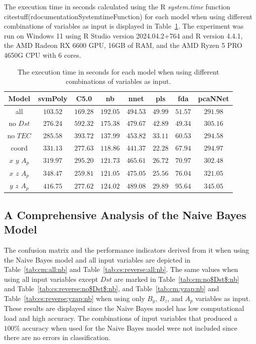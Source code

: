 \documentclass[preprint,12pt]{elsarticle}
\begin{document}
The execution time in seconds calculated using the R \textit{system.time} function citestuff(rdocumentationSystemtimeFunction) for each model when using different combinations of variables as input is displayed in Table~\ref{tab:time:total}. The experiment was run on Windows 11 using R Studio version 2024.04.2+764 and R version 4.4.1, the AMD Radeon RX 6600 GPU, 16GB of RAM, and the AMD Ryzen 5 PRO 4650G CPU with 6 cores.

\begin{table}[!ht]
	\centering
	\begin{tabular}{|c|c|c|c|c|c|c|c|}
		\hline
		Model & svmPoly & C5.0 & nb & nnet & pls & fda & pcaNNet \\ \hline
		all & $103.52$ & $169.28$ & $192.05$ & $494.53$ & $49.99$ & $51.57$ & $291.98$ \\ \hline
		no $Dst$ & $276.24$ & $592.32$ & $175.38$ & $479.67$ & $42.89$ & $49.34$ & $305.16$ \\ \hline
		no $TEC$ & $285.58$ & $393.72$ & $137.99$ & $453.82$ & $33.11$ & $60.53$ & $294.58$ \\ \hline
		coord & $331.13$ & $277.63$ & $118.86$ & $441.37$ & $22.28$ & $67.94$ & $294.97$ \\ \hline
		$x$ $y$ $A_{p}$ & $319.97$ & $295.20$ & $121.73$ & $465.61$ & $26.72$ & $70.97$ & $302.48$ \\ \hline
		$x$ $z$ $A_{p}$ & $348.47$ & $259.81$ & $121.05$ & $475.05$ & $25.56$ & $76.04$ & $321.05$ \\ \hline
		$y$ $z$ $A_{p}$ & $416.75$ & $277.62$ & $124.02$ & $489.08$ & $29.89$ & $95.64$ & $345.05$ \\ \hline
	\end{tabular}
	\caption{The execution time in seconds for each model when using different combinations of variables as input.}
	\label{tab:time:total}
\end{table}

\subsection{A Comprehensive Analysis of the Naive Bayes Model}

The confusion matrix and the performance indicators derived from it when using the Naive Bayes model and all input variables are depicted in Table~\ref{tab:cm:all:nb} and Table~\ref{tab:cs:reverse:all:nb}. The same values when using all input variables except $Dst$ are marked in Table~\ref{tab:cm:no$Dst$:nb} and Table~\ref{tab:cs:reverse:no$Dst$:nb}, and Table~\ref{tab:cm:yzap:nb} and Table~\ref{tab:cs:reverse:yzap:nb} when using only $B_{y}$, $B_{z}$, and $A_{p}$ variables as input. These results are displayed since the Naive Bayes model has low computational load and high accuracy. The combinations of input variables that produced a $100\%$ accuracy when used for the Naive Bayes model were not included since there are no errors in classification.
\end{document}
